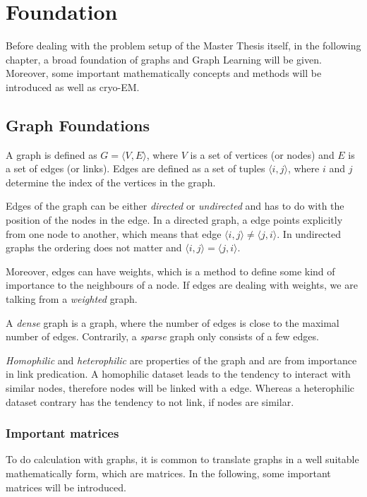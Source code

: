 \chapter{Foundation}
\label{sec:foundation}

Before dealing with the problem setup of the Master Thesis itself, in the following chapter, a broad foundation
of graphs and Graph Learning will be given. Moreover, some important mathematically concepts and methods will be introduced as well as cryo-EM.

\section{Graph Foundations}
A graph is defined as  $G = \langle V,E \rangle$, where $V$ is a set of 
vertices (or nodes) and $E$ is a set of edges (or links). 
Edges are defined as a set of tuples $\langle i,j \rangle$, where $i$ and $j$ determine the 
index of the vertices in the graph.

Edges of the graph can be either \textit{directed} or \textit{undirected} and has to do with the position of the 
nodes in the edge. In a directed graph, a edge points explicitly from
one node to another, which means that edge $\langle i,j \rangle \neq \langle j,i \rangle$. 
In undirected graphs the ordering does not matter and $\langle i,j \rangle = \langle j,i \rangle$.

Moreover, edges can have weights, which is a method to define some kind of importance to the neighbours of a node.
If edges are dealing with weights, we are talking from a \textit{weighted} graph.

A \textit{dense} graph is a graph, where the number of edges is close to the maximal number of edges.
Contrarily, a \textit{sparse} graph only consists of a few edges.

\textit{Homophilic} and \textit{heterophilic} are properties of the graph and are from importance in link predication. 
A homophilic dataset leads to the tendency to interact with similar nodes, therefore nodes will be linked with a edge. 
Whereas a heterophilic dataset contrary has the tendency to not link, if nodes are similar.

\subsection{Important matrices}
To do calculation with graphs, it is common to translate graphs in a well suitable mathematically
form, which are matrices. In the following, some important matrices will be introduced.

